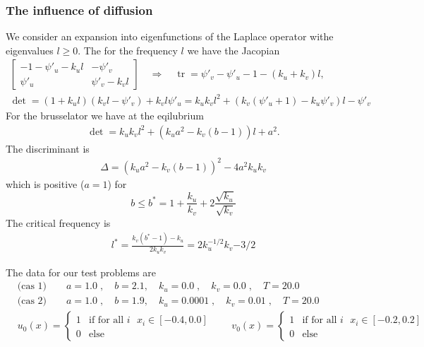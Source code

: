 \documentclass[11pt]{article}
\begin{document}
%
\subsubsection{The influence of diffusion}
%
We consider an expansion into eigenfunctions of the Laplace operator withe eigenvalues $l\ge0$. The for the frequency $l$ we have the Jacopian
%
\begin{align*}
\begin{bmatrix}
-1 -\psi'_u - k_ul& -\psi'_v\\ \psi'_u & \psi'_v - k_vl
\end{bmatrix}
\quad\Rightarrow\quad \operatorname{tr} = \psi'_v-\psi'_u-1- (k_u+ k_v)l,\\ 
\det=  (1+k_ul)(k_vl-\psi'_v) +k_vl\psi'_u  = k_uk_v l^2 +(k_v(\psi'_u+1)-k_u\psi'_v)l - \psi'_v
\end{align*}
For the brusselator we have at the eqilubrium
%
\begin{align*}
\det= k_uk_v l^2 +(k_u a^2-k_v(b-1))l +a^2.
\end{align*}
%
The discriminant is
%
\begin{align*}
\Delta = (k_u a^2-k_v(b-1))^2 - 4 a^2 k_uk_v
\end{align*}
%
which is positive ($a=1$) for
%
\begin{equation}\label{eq:}
b \le b^* = 1 + \frac{k_u}{k_v} + 2 \frac{\sqrt{k_u}}{\sqrt{k_v}}
\end{equation}
%
The critical frequency is
%
\begin{align*}
l^*  = \frac{k_v(b^*-1)-k_u}{2k_uk_v} = 2 k_u^{-1/2}k_v{-3/2}
\end{align*}
%





The data for our test problems are
%
\begin{align*}
&\mbox{(cas 1)}\qquad a = 1.0\;,\quad b=2.1, \quad k_u = 0.0\;, \quad k_v = 0.0\;,\quad T=20.0\\
&\mbox{(cas 2)}\qquad a = 1.0\;,\quad b=1.9, \quad k_u = 0.0001\;, \quad k_v = 0.01\;,\quad T=20.0\\
&u_0(x) = \begin{cases}
1 & \mbox{if for all $i$ $x_i \in [-0.4,0.0]$}\\
0 & \mbox{else}
\end{cases}
\qquad
v_0(x) = \begin{cases}
1 & \mbox{if for all $i$ $x_i \in [-0.2,0.2]$}\\
0 & \mbox{else}
\end{cases}
\end{align*}
%


\printbibliography
\end{document}
